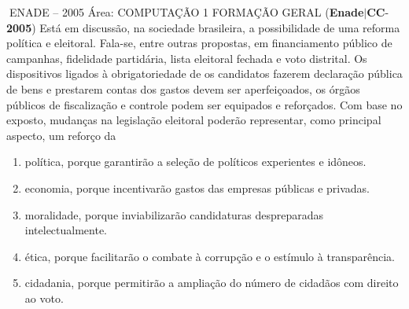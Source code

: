 \documentclass{exam}
\begin{document}
\begin{questions}
ENADE – 2005 Área: COMPUTAÇÃO 1
FORMAÇÃO GERAL
\question (\textbf{Enade}$|$\textbf{CC}-\textbf{2005}) Está em discussão, na sociedade brasileira, a possibilidade de uma
reforma política e eleitoral. Fala-se, entre outras propostas, em
financiamento público de campanhas, fidelidade partidária, lista
eleitoral fechada e voto distrital. Os dispositivos ligados à
obrigatoriedade de os candidatos fazerem declaração pública de
bens e prestarem contas dos gastos devem ser aperfeiçoados, os
órgãos públicos de fiscalização e controle podem ser equipados
e reforçados.
Com base no exposto, mudanças na legislação eleitoral poderão
representar, como principal aspecto, um reforço da
	\begin{enumerate}[label=\alph*)]
		\item  política, porque garantirão a seleção de políticos experientes
e idôneos.
		\item  economia, porque incentivarão gastos das empresas públicas
e privadas.
		\item  moralidade, porque inviabilizarão candidaturas despreparadas
intelectualmente.
		\item  ética, porque facilitarão o combate à corrupção e o estímulo
à transparência.
		\item  cidadania, porque permitirão a ampliação do número de
cidadãos com direito ao voto.

	\end{enumerate}


\end{questions}
\end{document}
